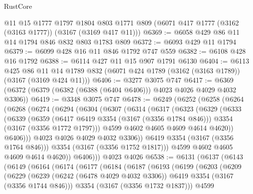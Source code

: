\begin{lexlean}{RustCore}
\begin{coremodule}
    @11
    @15
    @1777
    @1797
    @1804
    @803
    @1771
    @809
    (@6071 @417 @1777 (@3162 (@3163 @1777)) (@3167 (@3169 @417 @11)))
@6369 := @6058 @429 @86 @11 @14 @1794 @846 @832 @803 @1783 @809
@6372 := @6093 @429 @11 @1794
@6379 := @6099 @428 @16 @11 @846 @1792 @747 @559
@6382 := @6108 @428 @16 @1792
@6388 := @6114 @427 @11 @15 @907 @1791 @6130
@6404 := @6113
    @425
    @86
    @11
    @14
    @1789
    @832
    (@6071 @424 @1789 (@3162 (@3163 @1789)) (@3167 (@3169 @424 @11)))
@6406 := @3277 @3075 @747
@6417 := @6369 (@6372 (@6379 (@6382 (@6388 (@6404 @6406))) @4023 @4026 @4029 @4032 @3306))
@6419 := @3348 @3075 @747
@6478 := @6249
    (@6252
      (@6258
        (@6264
          (@6268
            (@6274
              (@6294
                (@6304
                  (@6307
                    (@6314
                      (@6317
                        (@6323
                          (@6329
                            (@6333
                              (@6339
                                (@6359
                                  (@6417 @6419 @3354 (@3167 (@3356 @1784 @846)))
                                  @3354
                                  (@3167 (@3356 @1772 @1797)))
                                @4599
                                @4602
                                @4605
                                @4609
                                @4614
                                @4620))
                            @6406)))
                      @4023
                      @4026
                      @4029
                      @4032
                      @3306))
                  @6419
                  @3354
                  (@3167 (@3356 @1764 @846)))
                @3354
                (@3167 (@3356 @1752 @1817)))
              @4599
              @4602
              @4605
              @4609
              @4614
              @4620))
          @6406)))
    @4023
    @4026
@6538 := @6131
    (@6137
      (@6143
        (@6149
          (@6164
            (@6174
              (@6177
                (@6184
                  (@6187
                    (@6193
                      (@6199
                        (@6203
                          (@6209
                            (@6229
                              (@6239
                                (@6242 (@6478 @4029 @4032 @3306))
                                @6419
                                @3354
                                (@3167 (@3356 @1744 @846)))
                              @3354
                              (@3167 (@3356 @1732 @1837)))
                            @4599

\end{coremodule}
\end{lexlean}
